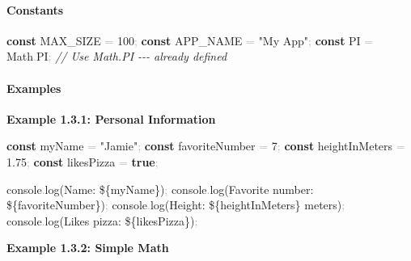 \documentclass[
  justified,
  openright,
]{tufte-book}
\let\subsection\paragraph
\let\paragraph\paragraph
\newcommand{\KeywordTok}[1]{\textcolor{CodeKeyword}{\textbf{#1}}}  %
\newcommand{\StringTok}[1]{\textcolor{CodeString}{#1}}              %
\newcommand{\CommentTok}[1]{\textcolor{CodeComment}{\textit{#1}}}  %
\newcommand{\CodeNumTok}[1]{\textcolor{CodeNumber}{#1}}             %
\newcommand{\CodeFuncTok}[1]{\textcolor{CodeKeyword}{#1}}           %
\newcommand{\OperatorTok}[1]{\textcolor{DarkGray}{#1}}              %
\newenvironment{Shaded}{%
  \begin{mdframed}[style=TufteCode]%
}{%
  \end{mdframed}%
}
\let\subsection\paragraph
\let\paragraph\paragraph
\begin{document}
\subsection{Constants}\label{constants}

\begin{Shaded}
\begin{Highlighting}[]
\KeywordTok{const} MAX\_SIZE \OperatorTok{=} \CodeNumTok{100}\OperatorTok{;}
\KeywordTok{const} APP\_NAME \OperatorTok{=} \StringTok{"My App"}\OperatorTok{;}
\KeywordTok{const} \CodeNumTok{PI} \OperatorTok{=} Math\OperatorTok{.}\CodeNumTok{PI}\OperatorTok{;} \CommentTok{// Use Math.PI {-}{-}{-} already defined}
\end{Highlighting}
\end{Shaded}

\subsection{Examples}\label{examples-14}

\textbf{Example 1.3.1: Personal Information}

\begin{Shaded}
\begin{Highlighting}[]
\KeywordTok{const} myName \OperatorTok{=} \StringTok{"Jamie"}\OperatorTok{;}
\KeywordTok{const} favoriteNumber \OperatorTok{=} \CodeNumTok{7}\OperatorTok{;}
\KeywordTok{const} heightInMeters \OperatorTok{=} \CodeNumTok{1.75}\OperatorTok{;}
\KeywordTok{const} likesPizza \OperatorTok{=} \KeywordTok{true}\OperatorTok{;}
 
console\OperatorTok{.}\CodeFuncTok{log}(\StringTok{\textasciigrave{}Name: }\StringTok{\$\{}myName\StringTok{\}}\StringTok{\textasciigrave{}})\OperatorTok{;}
console\OperatorTok{.}\CodeFuncTok{log}(\StringTok{\textasciigrave{}Favorite number: }\StringTok{\$\{}favoriteNumber\StringTok{\}}\StringTok{\textasciigrave{}})\OperatorTok{;}
console\OperatorTok{.}\CodeFuncTok{log}(\StringTok{\textasciigrave{}Height: }\StringTok{\$\{}heightInMeters\StringTok{\}}\StringTok{ meters\textasciigrave{}})\OperatorTok{;}
console\OperatorTok{.}\CodeFuncTok{log}(\StringTok{\textasciigrave{}Likes pizza: }\StringTok{\$\{}likesPizza\StringTok{\}}\StringTok{\textasciigrave{}})\OperatorTok{;}
\end{Highlighting}
\end{Shaded}

\textbf{Example 1.3.2: Simple Math}
\end{document}
